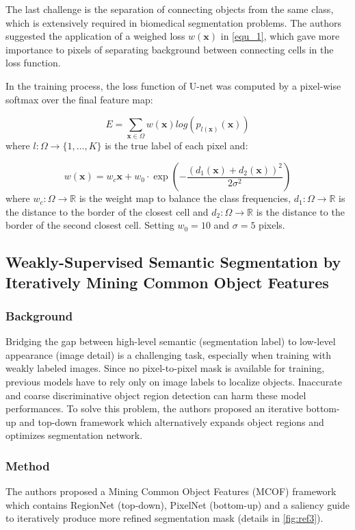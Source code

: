 \documentclass{article}
\begin{document}
The last challenge is the separation of connecting objects from the same class, which is extensively required in biomedical segmentation problems. The authors suggested the application of a weighed loss $w(\bm{x})$ in \ref{equ_1}, which gave more importance to pixels of separating background between connecting cells in the loss function.

In the training process, the loss function of U-net was computed by a pixel-wise softmax over the final feature map:

\begin{equation}
E = \sum_{\bm{x} \in \Omega} w(\bm{x})log(p_{l(\bm{x})}(\bm{x}))
\label{equ_1}
\end{equation}
where $l: \Omega \to \{1, \dots, K\}$ is the true label of each pixel and:

\begin{equation}
w(\bm{x}) = w_c{\bm{x}} + w_0 \cdot \exp ( - \frac{(d_1(\bm{x}) + d_2(\bm{x}))^2}{2 \sigma ^2})
\end{equation}
where $w_c : \Omega \to \mathbb{R}$ is the weight map to balance the class frequencies, $d_1 : \Omega \to \mathbb{R}$ is the distance to the border of the closest cell and $d_2 : \Omega \to \mathbb{R}$ is the distance to the border of the second closest cell. Setting $w_0 = 10$ and $\sigma = 5$ pixels.

\subsection{Weakly-Supervised Semantic Segmentation by Iteratively Mining Common Object Features \cite{Wang2018WeaklySupervisedSS}}

\subsubsection{Background}
Bridging the gap between high-level semantic (segmentation label) to low-level appearance (image detail) is a challenging task, especially when training with weakly labeled images. Since no pixel-to-pixel mask is available for training, previous models have to rely only on image labels to localize objects. Inaccurate and coarse discriminative object region detection can harm these model performances. To solve this problem, the authors proposed an iterative bottom-up and top-down framework which alternatively expands object regions and optimizes segmentation network. 

\subsubsection{Method}
The authors proposed a Mining Common Object Features (MCOF) framework which contains RegionNet (top-down), PixelNet (bottom-up) and a saliency guide to iteratively produce more refined segmentation mask (details in \ref{fig:ref3}).
\end{document}

